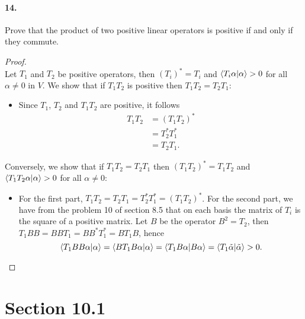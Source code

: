 \documentclass{article}
\theoremstyle{plain}
\theoremstyle{definition}
\theoremstyle{remark}
\begin{document}
    \paragraph{14.}
      Prove that the product of two positive linear operators is positive if and only if they commute.
      \begin{proof}$ $\\
        Let $T_1$ and $T_2$ be positive operators, then $(T_i)^* = T_i$ and $\braket{T_i\alpha}{\alpha}>0$ for all $\alpha\neq 0$ in $V$. We show that if $T_1T_2$ is positive then $T_1T_2 = T_2T_1$:
        \begin{itemize}
          \item[ ] Since $T_1$, $T_2$ and $T_1T_2$ are positive, it follows
          \begin{align*}
            T_1T_2   & = (T_1T_2)^*\\
                         & = T_2^*T_1^*\\
                         & = T_2 T_1.
          \end{align*}
        \end{itemize}
        Conversely, we show that if $T_1T_2=T_2T_1$ then $(T_1T_2)^*=T_1T_2$ and $\braket{T_1T_2 \alpha}{\alpha}>0$ for all $\alpha\neq 0$:
        \begin{itemize}
          \item[ ] For the first part, $T_1T_2 = T_2T_1=T_2^*T_1^* =(T_1T_2)^*$.  For the second part, we have from the problem 10 of section 8.5 that on each basis the matrix of $T_i$ is the square of a positive matrix. Let $B$ be the operator $B^2 =T_2$, then $T_1BB=BBT_1=BB^*T_1^* = BT_1 B$, hence
          $$\braket{T_1BB\alpha}{\alpha}=\braket{BT_1B\alpha}{\alpha} = \braket{T_1B\alpha}{B\alpha} =\braket{T_1\tilde{\alpha}}{\tilde{\alpha}}>0.$$
        \end{itemize}
      \end{proof}
  \section*{Section 10.1}
\end{document}
